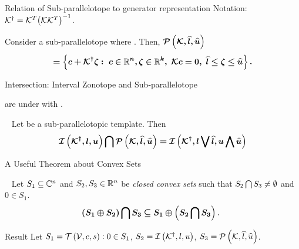 \begin{frame}{Relation of Sub-parallelotope to generator representation}
Notation: ${\mathcal{K}}^\dagger={\mathcal{K}}^T{\left(\mathcal{K}{\mathcal{K}}^T\right)}^{-1}$.
%
\begin{proposition}
  Consider a sub-parallelotope
  \eqncol{$\ptope{\qtemp}{\plb}{\pub}$} where .
  Then, $\bm{\mathcal{P}\left(\mathcal{K},\widehat{l},\widehat{u}\right)}$\vspace{-1em}
  \[
   \bm{=\left\{c+{\mathcal{K}}^\dagger\zeta:~c\in\mathbb{R}^n,\zeta\in\mathbb{R}^k,~\mathcal{K}
  c=0,~\widehat{l}\leq
  \zeta\leq \widehat{u}
  \right\}.
  }
  \]
\end{proposition}
%
\end{frame}

\begin{frame}{Intersection: Interval Zonotope and Sub-parallelotope}

 are  under 
with  .  
%
\begin{lemma}~\label{lem:motivation}
Let  be a sub-parallelotopic template.  Then
%
\[\bm{
\mathit{\operatorname{\mathcal{I}}}\left({\mathcal{K}}^\dagger,l,u\right) \bigcap \mathcal{P}\left(\mathcal{K},\widehat{l},\widehat{u}\right)
= \mathit{\operatorname{\mathcal{I}}}\left({\mathcal{K}}^\dagger,l\bigvee \widehat{l},u\bigwedge \widehat{u}\right)
}
\]
\end{lemma}
%
\end{frame}

\begin{frame}{A Useful Theorem about Convex Sets}
\begin{lemma}~\label{gen-int}
Let {\it $S_1\subseteq \mathbb{C}^n$} and {\it $S_2,S_3\in\mathbb{R}^n$}
be {\it closed
convex sets} such that {$S_2\bigcap S_3\neq \emptyset$} and
{$0\in S_1$}.
%
\begin{align}~\label{eqn:minsum-intersection}
& \bm{\left(S_1\oplus S_2\right)\bigcap S_3\subseteq S_1\oplus\left(S_2\bigcap S_3\right)}.
\end{align}
%
\end{lemma}
\pause
%
\begin{exampleblock}{Result}
Let $S_1=\mathit{\operatorname{\mathcal{T}}}\left(\mathcal{V},c,s\right): 0\in S_1$,
$S_2=\mathit{\operatorname{\mathcal{I}}}\left({\mathcal{K}}^\dagger,l,u\right)$,
$S_3=\mathcal{P}\left(\mathcal{K},\widehat{l},\widehat{u}\right)$.
%
%
\end{exampleblock}
%
\end{frame}

